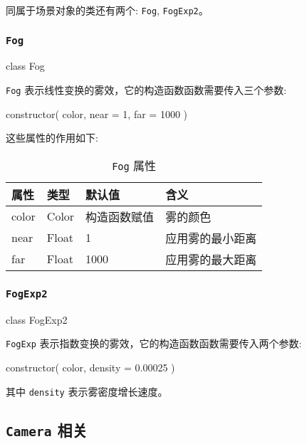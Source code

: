 同属于场景对象的类还有两个: \texttt{Fog}, \texttt{FogExp2}。

\subsubsection*{\texttt{Fog}}

\begin{JavaScript}
class Fog
\end{JavaScript}

\texttt{Fog} 表示线性变换的雾效，它的构造函数函数需要传入三个参数:

\begin{JavaScript}
constructor( color, near = 1, far = 1000 )
\end{JavaScript}

这些属性的作用如下:

\begin{table}[H]
  \centering
  \caption{\texttt{Fog} 属性}
  \setlength{\tabcolsep}{4mm}
  \begin{tabular}{l|l|l|p{8cm}}
    \toprule
    \textbf{属性} & \textbf{类型} & \textbf{默认值} & \textbf{含义} \\
    \midrule
    color & Color & 构造函数赋值 & 雾的颜色 \\
    near & Float & 1 & 应用雾的最小距离 \\
    far & Float & 1000 & 应用雾的最大距离 \\
    \bottomrule
  \end{tabular}
\end{table}

\subsubsection*{\texttt{FogExp2}}

\begin{JavaScript}
class FogExp2
\end{JavaScript}

\texttt{FogExp} 表示指数变换的雾效，它的构造函数函数需要传入两个参数:

\begin{JavaScript}
constructor( color, density = 0.00025 )
\end{JavaScript}

其中 \texttt{density} 表示雾密度增长速度。

\subsection{\texttt{Camera} 相关}

